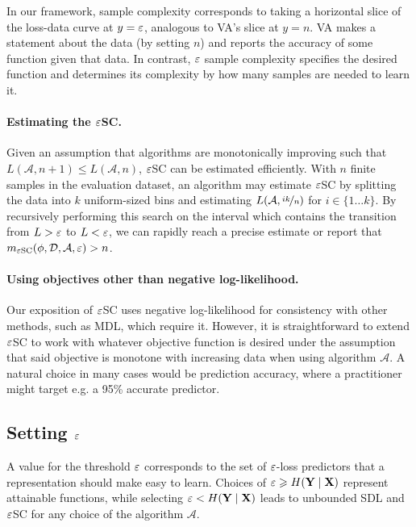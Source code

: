In our framework, sample complexity corresponds to taking a horizontal slice of the loss-data curve at $y = \varepsilon$, analogous to VA's slice at $y=n$.
VA makes a statement about the data (by setting $n$) and reports the accuracy of some function given that data.
In contrast, $\varepsilon$ sample complexity specifies the desired function and determines its complexity by how many samples are needed to learn it.

\paragraph{Estimating the $\varepsilon$SC.}
Given an assumption that algorithms are monotonically improving such that $ L(\mathcal{A}, n+1) \le L(\mathcal{A}, n)$, $\varepsilon$SC can be estimated efficiently.
With $n$ finite samples in the evaluation dataset, an algorithm may estimate $\varepsilon$SC by splitting the data into $k$ uniform-sized bins and estimating $L(\mathcal{A}, \nicefrac{ik}{n})$ for $i \in \{1 \ldots k \}$.
By recursively performing this search on the interval which contains the transition from $L > \varepsilon$ to $L < \varepsilon$, we can rapidly reach a precise estimate or report that $m_{\varepsilon\mathrm{SC}}(\phi, \mathcal{D}, \mathcal{A},\varepsilon) > n$.

\paragraph{Using objectives other than negative log-likelihood.}
Our exposition of $\varepsilon$SC uses negative log-likelihood for consistency with other methods, such as MDL, which require it.
However, it is straightforward to extend $\varepsilon$SC to work with whatever objective function is desired under the assumption that said objective is monotone with increasing data when using algorithm $\mathcal{A}$.
A natural choice in many cases would be prediction accuracy, where a practitioner might target e.g. a 95\% accurate predictor.

\subsection{Setting $\varepsilon$}

A value for the threshold $\varepsilon$ corresponds to the set of $\varepsilon$-loss predictors that a representation should make easy to learn.
Choices of $\varepsilon \geqslant H({\mathbf{Y}} \mid {\mathbf{X}})$ represent attainable functions, while selecting $\varepsilon < H({\mathbf{Y}} \mid {\mathbf{X}})$ leads to unbounded SDL and $\varepsilon$SC for any choice of the algorithm $\mathcal{A}$.

